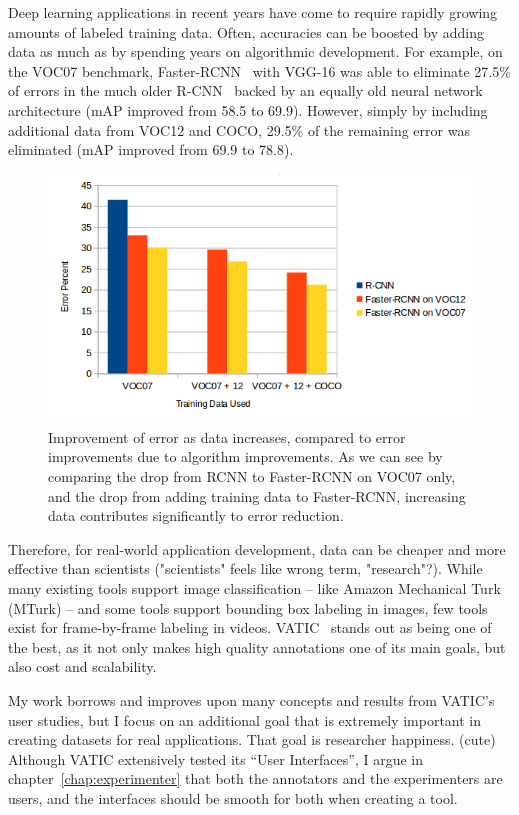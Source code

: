 Deep learning applications in recent years have come to require rapidly growing amounts of labeled training data.
Often, accuracies can be boosted by adding data as much as by spending years on algorithmic development.
For example, on the VOC07 benchmark, Faster-RCNN~\cite{FasterRCNN} with VGG-16 was able to eliminate 27.5\% of errors in the much older R-CNN~\cite{RCNN} backed by an equally old neural network architecture (mAP improved from 58.5 to 69.9).
However, simply by including additional data from VOC12 and COCO, 29.5\% of the remaining error was eliminated (mAP improved from 69.9 to 78.8).

\begin{figure}[h]
\includegraphics[width=14cm]{figs/data_vs_error.png}
\centering
\caption{Improvement of error as data increases, compared to error improvements due to algorithm improvements.
As we can see by comparing the drop from RCNN to Faster-RCNN on VOC07 only, and the drop from adding training data to Faster-RCNN, increasing data contributes significantly to error reduction.}
\end{figure}

Therefore, for real-world application development, data can be cheaper and more effective than scientists ("scientists" feels like wrong term, "research"?).
While many existing tools support image classification -- like Amazon Mechanical Turk (MTurk) -- and some tools support bounding box labeling in images, few tools exist for frame-by-frame labeling in videos.
VATIC~\cite{Vatic} stands out as being one of the best, as it not only makes high quality annotations one of its main goals, but also cost and scalability.

My work borrows and improves upon many concepts and results from VATIC's user studies, but I focus on an additional goal that is extremely important in creating datasets for real applications. That goal is researcher happiness. (cute)
Although VATIC extensively tested its ``User Interfaces'', I argue in chapter~\ref{chap:experimenter} that both the annotators and the experimenters are users, and the interfaces should be smooth for both when creating a tool.

